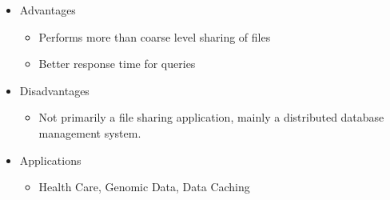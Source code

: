 \documentclass[9pt]{beamer}
\begin{document}
\begin{frame}{}
\begin{itemize}
    \item Advantages
    \begin{itemize}
    \item Performs more than coarse level sharing of files
\item Better response time for queries 

\end{itemize}
\end{itemize}

\begin{itemize}
    \item Disadvantages
    \begin{itemize}
    \item Not primarily a file sharing application, mainly a distributed database management system.

\end{itemize}
\end{itemize}

\begin{itemize}
    \item Applications
    \begin{itemize}
    \item Health Care, Genomic Data, Data Caching

\end{itemize}
\end{itemize}
    
\end{frame}
\end{document}
